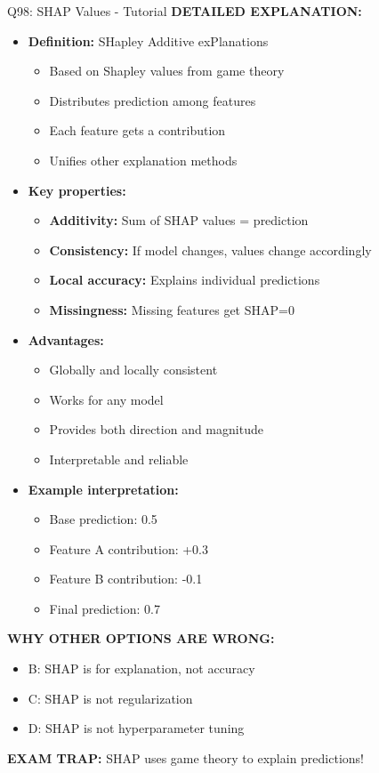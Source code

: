\documentclass[8pt]{beamer}
\begin{document}
\begin{frame}{Q98: SHAP Values - Tutorial}
		\vspace{0.05cm}
		\textbf{DETAILED EXPLANATION:}
		\begin{itemize}
			\item \textbf{Definition:} SHapley Additive exPlanations
			\begin{itemize}
				\item Based on Shapley values from game theory
				\item Distributes prediction among features
				\item Each feature gets a contribution
				\item Unifies other explanation methods
			\end{itemize}
			\item \textbf{Key properties:}
			\begin{itemize}
				\item \textbf{Additivity:} Sum of SHAP values = prediction
				\item \textbf{Consistency:} If model changes, values change accordingly
				\item \textbf{Local accuracy:} Explains individual predictions
				\item \textbf{Missingness:} Missing features get SHAP=0
			\end{itemize}
			\item \textbf{Advantages:}
			\begin{itemize}
				\item Globally and locally consistent
				\item Works for any model
				\item Provides both direction and magnitude
				\item Interpretable and reliable
			\end{itemize}
			\item \textbf{Example interpretation:}
			\begin{itemize}
				\item Base prediction: 0.5
				\item Feature A contribution: +0.3
				\item Feature B contribution: -0.1
				\item Final prediction: 0.7
			\end{itemize}
		\end{itemize}
		
		\vspace{0.05cm}
		\textcolor{myred}{\textbf{WHY OTHER OPTIONS ARE WRONG:}}
		\begin{itemize}
			\item \textcolor{myred}{B:} SHAP is for explanation, not accuracy
			\item \textcolor{myred}{C:} SHAP is not regularization
			\item \textcolor{myred}{D:} SHAP is not hyperparameter tuning
		\end{itemize}
		
		\textcolor{myred}{\textbf{EXAM TRAP:}} SHAP uses game theory to explain predictions!
	\end{frame}
	
\end{document}
